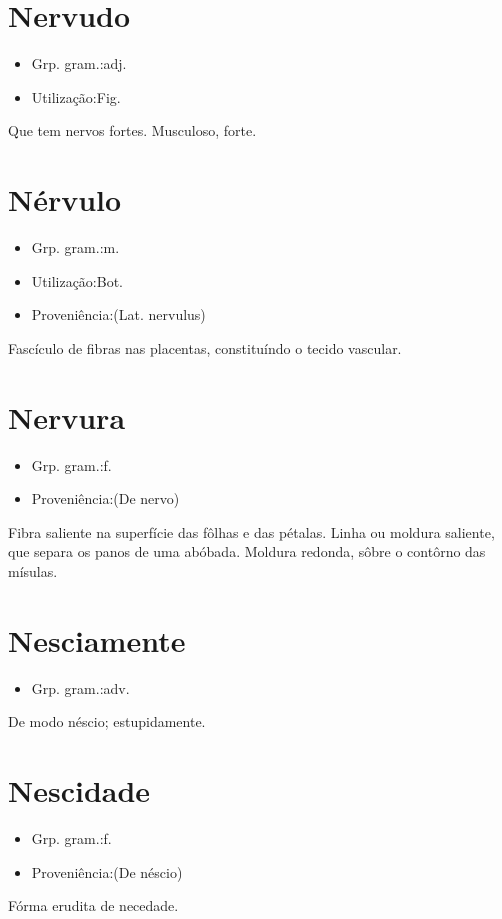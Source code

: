 \section{Nervudo}
\begin{itemize}
\item {Grp. gram.:adj.}
\end{itemize}
\begin{itemize}
\item {Utilização:Fig.}
\end{itemize}
Que tem nervos fortes.
Musculoso, forte.
\section{Nérvulo}
\begin{itemize}
\item {Grp. gram.:m.}
\end{itemize}
\begin{itemize}
\item {Utilização:Bot.}
\end{itemize}
\begin{itemize}
\item {Proveniência:(Lat. \textunderscore nervulus\textunderscore )}
\end{itemize}
Fascículo de fibras nas placentas, constituíndo o tecido vascular.
\section{Nervura}
\begin{itemize}
\item {Grp. gram.:f.}
\end{itemize}
\begin{itemize}
\item {Proveniência:(De \textunderscore nervo\textunderscore )}
\end{itemize}
Fibra saliente na superfície das fôlhas e das pétalas.
Linha ou moldura saliente, que separa os panos de uma abóbada.
Moldura redonda, sôbre o contôrno das mísulas.
\section{Nesciamente}
\begin{itemize}
\item {Grp. gram.:adv.}
\end{itemize}
De modo néscio; estupidamente.
\section{Nescidade}
\begin{itemize}
\item {Grp. gram.:f.}
\end{itemize}
\begin{itemize}
\item {Proveniência:(De \textunderscore néscio\textunderscore )}
\end{itemize}
Fórma erudita de \textunderscore necedade\textunderscore .
